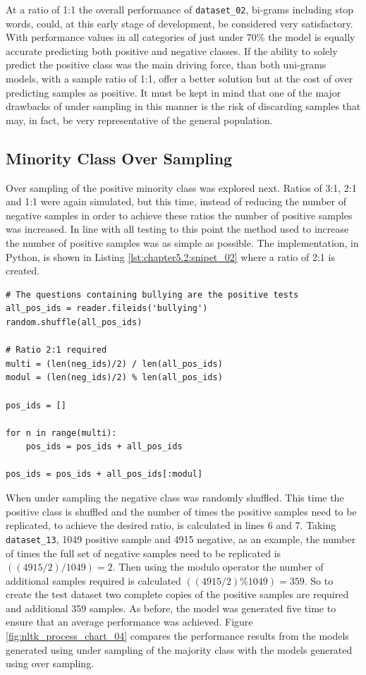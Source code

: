 At a ratio of 1:1 the overall performance of \verb|dataset_02|, bi-grams including stop words, could, at this early stage of development, be considered very satisfactory. With performance values in all categories of just under 70\% the model is equally accurate predicting both positive and negative classes. If the ability to solely predict the positive class was the main driving force, than both uni-grams models, with a sample ratio of 1:1, offer a better solution but at the cost of over predicting samples as positive. It must be kept in mind that one of the major drawbacks of under sampling in this manner is the risk of discarding samples that may, in fact, be very representative of the general population.

\subsection{Minority Class Over Sampling}
Over sampling of the positive minority class was explored next. Ratios of 3:1, 2:1 and 1:1 were again simulated, but this time, instead of reducing the number of negative samples in order to achieve these ratios the number of positive samples was increased. In line with all testing to this point the method used to increase the number of positive samples was as simple as possible. The implementation, in Python, is shown in Listing \ref{lst:chapter5.2:snipet_02} where a ratio of 2:1 is created.

\begin{lstlisting}[caption={Adjust the postive to negative class ratio}, label=lst:chapter5.2:snipet_02]
# The questions containing bullying are the positive tests
all_pos_ids = reader.fileids('bullying')
random.shuffle(all_pos_ids)

# Ratio 2:1 required
multi = (len(neg_ids)/2) / len(all_pos_ids)
modul = (len(neg_ids)/2) % len(all_pos_ids)

pos_ids = []

for n in range(multi):
    pos_ids = pos_ids + all_pos_ids

pos_ids = pos_ids + all_pos_ids[:modul]
\end{lstlisting}

When under sampling the negative class was randomly shuffled. This time the positive class is shuffled and the number of times the positive samples need to be replicated, to achieve the desired ratio, is calculated in lines 6 and 7. Taking \verb|dataset_13|, 1049 positive sample and 4915 negative, as an example, the number of times the full set of negative samples need to be replicated is $ ((4915/2) / 1049) = 2$. Then using the modulo operator the number of additional samples required is calculated $ ((4915/2) \% 1049) = 359$. So to create the test dataset two complete copies of the positive samples are required and additional 359 samples. As before, the model was generated five time to ensure that an average performance was achieved. Figure \ref{fig:nltk_process_chart_04} compares the performance results from the models generated using under sampling of the majority class with the models generated using over sampling.

